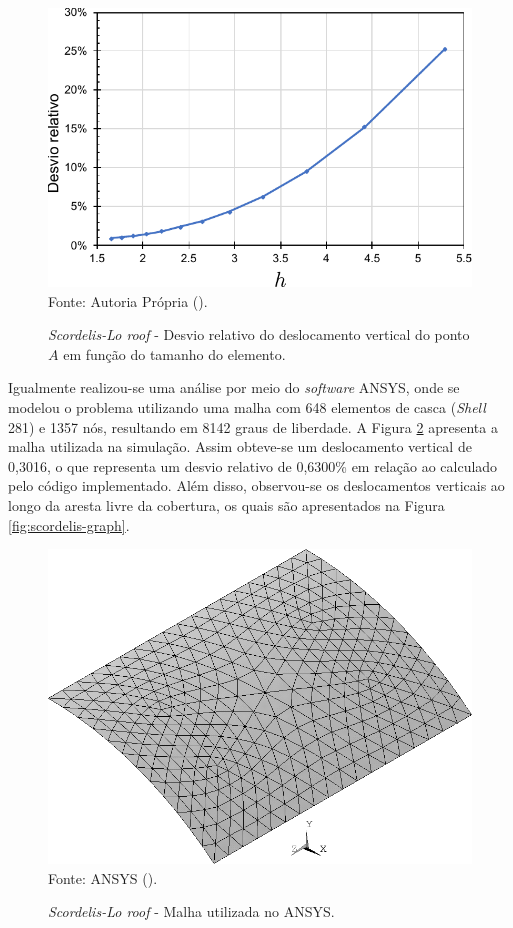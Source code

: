 \begin{figure}[h!]
    \centering
    \caption{\textit{Scordelis-Lo roof} - Desvio relativo do deslocamento vertical do ponto $A$ em função do tamanho do elemento.}
    \includegraphics[width=0.6\linewidth]{Figuras/scordelis/static-sol.pdf}
    \\Fonte: Autoria Própria (\the\year).
    \label{fig:shell-static-sol}
\end{figure}

Igualmente realizou-se  uma análise por meio do \textit{software} ANSYS, onde se modelou o problema utilizando uma malha com 648 elementos de casca (\textit{Shell} 281) e 1357 nós, resultando em 8142 graus de liberdade. A Figura \ref{fig:scordelisANSYS} apresenta a malha utilizada na simulação. Assim obteve-se um deslocamento vertical de 0,3016, o que representa um desvio relativo de 0,6300\% em relação ao calculado pelo código implementado. Além disso, observou-se os deslocamentos verticais ao longo da aresta livre da cobertura, os quais são apresentados na Figura \ref{fig:scordelis-graph}.

\begin{figure}[h!]
    \centering
    \caption{\textit{Scordelis-Lo roof} - Malha utilizada no ANSYS.}
    \includegraphics[width=0.45\linewidth]{Figuras/scordelis/ANSYS.png}
    \\Fonte: ANSYS (\the\year).
    \label{fig:scordelisANSYS}
\end{figure}

